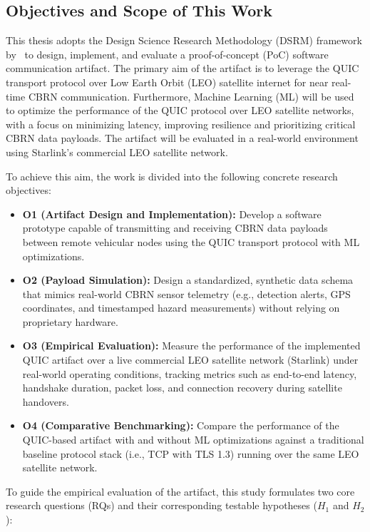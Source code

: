 \subsection{Objectives and Scope of This Work}
This thesis adopts the Design Science Research Methodology (DSRM) framework by~\citet{DSRMethodology2007} to design, implement, and evaluate a proof-of-concept (PoC) software communication artifact. The primary aim of the artifact is to leverage the QUIC transport protocol over Low Earth Orbit (LEO) satellite internet for near real-time CBRN communication. Furthermore, Machine Learning (ML) will be used to optimize the performance of the QUIC protocol over LEO satellite networks, with a focus on minimizing latency, improving resilience and prioritizing critical CBRN data payloads. The artifact will be evaluated in a real-world environment using Starlink's commercial LEO satellite network.

To achieve this aim, the work is divided into the following concrete research objectives:
\begin{itemize}
    \item \textbf{O1 (Artifact Design and Implementation):} Develop a software prototype capable of transmitting and receiving CBRN data payloads between remote vehicular nodes using the QUIC transport protocol with ML optimizations.
    \item \textbf{O2 (Payload Simulation):} Design a standardized, synthetic data schema that mimics real-world CBRN sensor telemetry (e.g., detection alerts, GPS coordinates, and timestamped hazard measurements) without relying on proprietary hardware.
    \item \textbf{O3 (Empirical Evaluation):} Measure the performance of the implemented QUIC artifact over a live commercial LEO satellite network (Starlink) under real-world operating conditions, tracking metrics such as end-to-end latency, handshake duration, packet loss, and connection recovery during satellite handovers.
    \item \textbf{O4 (Comparative Benchmarking):} Compare the performance of the QUIC-based artifact with and without ML optimizations against a traditional baseline protocol stack (i.e., TCP with TLS 1.3) running over the same LEO satellite network.
\end{itemize}

\par
To guide the empirical evaluation of the artifact, this study formulates two core research questions (RQs) and their corresponding testable hypotheses ($H_1$ and $H_2$):


